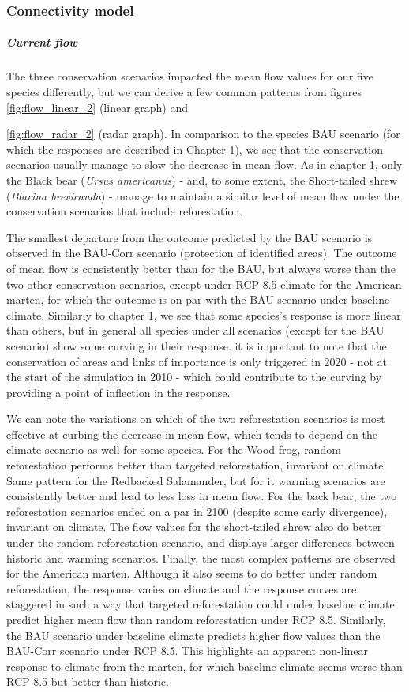 \subsubsection{Connectivity model}

\vspace{1em}

\subparagraph*{\textit{Current flow}} The three conservation scenarios impacted the mean flow values for our five species differently, but we can derive a few common patterns from figures \ref{fig:flow_linear_2} (linear graph) and {\ref{fig:flow_radar_2} (radar graph). In comparison to the species BAU scenario (for which the responses are described in Chapter 1), we see that the conservation scenarios usually manage to slow the decrease in mean flow. As in chapter 1, only the Black bear (\textit{Ursus americanus}) - and, to some extent, the Short-tailed shrew (\textit{Blarina brevicauda}) - manage to maintain a similar level of mean flow under the conservation scenarios that include reforestation.

The smallest departure from the outcome predicted by the BAU scenario is observed in the BAU-Corr scenario (protection of identified areas). The outcome of mean flow is consistently better than for the BAU, but always worse than the two other conservation scenarios, except under RCP 8.5 climate for the American marten, for which the outcome is on par with the BAU scenario under baseline climate.  Similarly to chapter 1, we see that some species's response is more linear than others, but in general all species under all scenarios (except for the BAU scenario) show some curving in their response. it is important to note that the conservation of areas and links of importance is only triggered in 2020  - not at the start of the simulation in 2010 - which could contribute to the curving by providing a point of inflection in the response.

We can note the variations on which of the two reforestation scenarios is most effective at curbing the decrease in mean flow, which tends to depend on the climate scenario as well for some species. For the Wood frog, random reforestation performs better than targeted reforestation, invariant on climate. Same pattern for the Redbacked Salamander, but for it warming scenarios are consistently better and lead to less loss in mean flow. For the back bear, the two reforestation scenarios ended on a par in 2100 (despite some early divergence), invariant on climate. The flow values for the short-tailed shrew also do better under the random reforestation scenario, and displays larger differences between historic and warming scenarios. Finally, the most complex patterns are observed for the American marten.  Although it also seems to do better under random reforestation,  the response varies on climate and the response curves are staggered in such a way that targeted reforestation could under baseline climate predict higher mean flow than random reforestation under RCP 8.5. Similarly, the BAU scenario under baseline climate predicts higher flow values than the BAU-Corr scenario under RCP 8.5. This highlights an apparent non-linear response to climate from the marten, for which baseline climate seems worse than RCP 8.5 but better than historic.

}
